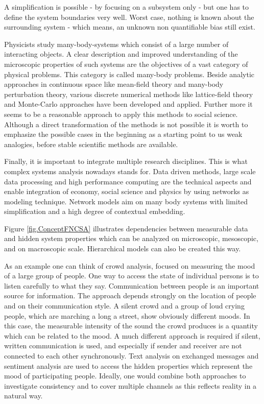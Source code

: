 \documentclass[a4paper,10pt]{scrbook}
\begin{document}
A simplification is possible - by focusing on a subsystem only - but one has to define the system boundaries very well. Worst case, nothing is known about the surrounding system - which means, an unknown non quantifiable bias still exist.

Physicists study many-body-systems which consist of a large number of interacting objects. A clear description and improved understanding of the microscopic properties of such systems are the objectives of a vast category of physical problems. This category is called many-body problems. Beside analytic approaches in continuous space like mean-field theory and many-body perturbation theory, various discrete numerical methods like lattice-field theory and Monte-Carlo approaches have been developed and applied. Further more it seems to be a reasonable approach to apply this methods to social science. Although a direct transformation of the methods is not possible it is worth to emphasize the possible cases in the beginning as a starting point to us weak analogies, before stable scientific methods are available. 

Finally, it is important to integrate multiple research disciplines. This is what complex
systems analysis nowadays stands for. Data driven methods, large scale data processing and high performance computing are the technical aspects and enable integration of economy, social science and physics by using networks as modeling technique. Network models aim on many body systems with limited simplification and a high degree of contextual embedding.
 

\label{ext.fig.ConceptFNCSA} 


Figure \ref{fig.ConceptFNCSA} illustrates dependencies between measurable data and hidden system properties which can be analyzed on microscopic, mesoscopic, and on macroscopic scale. Hierarchical models can also be created this way.

As an example one can think of crowd analysis, focused on measuring the mood of a large group of people. One way to access the state of individual persons is to listen carefully to what they say. Communication between people is an important source for information. The approach depends strongly on the location of people and on their communication style. A silent crowd and a group of loud crying people, which are marching a long a street, show obviously different moods. In this case, the measurable intensity of the sound the crowd produces is a quantity which can be related to the mood. A much different approach is required if silent, written communication is used, and especially if sender and receiver are not connected to each other synchronously. Text analysis on exchanged messages and sentiment analysis are used to access the hidden properties which represent the mood of participating people. Ideally, one would combine both approaches to investigate consistency and to cover multiple channels as this reflects reality in a natural way.
\end{document}
